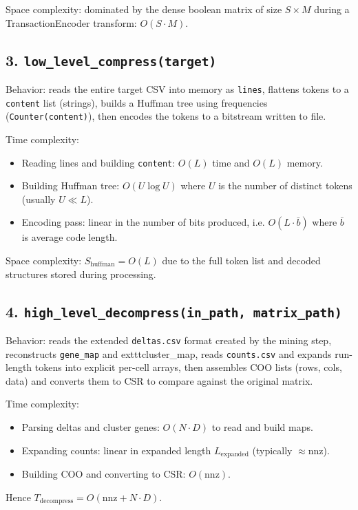 \documentclass[11pt]{article}
\begin{document}
Space complexity: dominated by the dense boolean matrix of size $S\times M$ during a TransactionEncoder transform: $O(S\cdot M)$.

\subsection*{3. \texttt{low\_level\_compress(target)}}
Behavior: reads the entire target CSV into memory as \texttt{lines}, flattens tokens to a \texttt{content} list (strings),
builds a Huffman tree using frequencies (\texttt{Counter(content)}), then encodes the tokens to a bitstream written to file.

Time complexity:
\begin{itemize}
	\item Reading lines and building \texttt{content}: $O(L)$ time and $O(L)$ memory.
	\item Building Huffman tree: $O(U\log U)$ where $U$ is the number of distinct tokens (usually $U\ll L$).
	\item Encoding pass: linear in the number of bits produced, i.e. $O(L\cdot \bar{b})$ where $\bar{b}$ is average code length.
\end{itemize}

Space complexity: $S_{\text{huffman}} = O(L)$ due to the full token list and decoded structures stored during processing.

\subsection*{4. \texttt{high\_level\_decompress(in\_path, matrix\_path)}}
Behavior: reads the extended \texttt{deltas.csv} format created by the mining step, reconstructs \texttt{gene\_map} and
	exttt{cluster\_map}, reads \texttt{counts.csv} and expands run-length tokens into explicit per-cell arrays,
then assembles COO lists (rows, cols, data) and converts them to CSR to compare against the original matrix.

Time complexity:
\begin{itemize}
	\item Parsing deltas and cluster genes: $O(N\cdot D)$ to read and build maps.
	\item Expanding counts: linear in expanded length $L_{\text{expanded}}$ (typically $\approx\mathrm{nnz}$).
	\item Building COO and converting to CSR: $O(\mathrm{nnz})$.
\end{itemize}
Hence $T_{\text{decompress}}=O(\mathrm{nnz}+N\cdot D)$.
\end{document}
